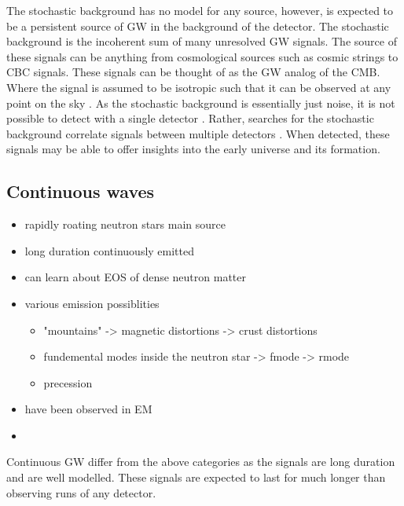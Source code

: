 The stochastic background has no model for any source, however, is expected to be a persistent source of \ac{GW} in the background of the detector. 
The stochastic background is the incoherent sum of many unresolved \ac{GW} signals.
The source of these signals can be anything from cosmological sources such as cosmic strings to \ac{CBC} signals.
These signals can be thought of as the \ac{GW} analog of the \ac{CMB}.
Where the signal is assumed to be isotropic such that it can be observed at any point on the sky \citep{Christensen2018StochasticBackgrounds}. 
As the stochastic background is essentially just noise, it is not possible to detect with a single detector \citep{Christensen2018StochasticBackgrounds}.
Rather, searches for the stochastic background correlate signals between multiple detectors \citep{Romano2019SearchesBackgrounds,Christensen2018StochasticBackgrounds}. 
When detected, these signals may be able to offer insights into the early universe and its formation.



\subsection{Continuous waves}

\begin{itemize}
    \item rapidly roating neutron stars main source
    \item long duration continuously emitted
    \item can learn about EOS of dense neutron matter
    \item various emission possiblities
    \begin{itemize}
        \item "mountains" -> magnetic distortions -> crust distortions
        \item fundemental modes inside the neutron star -> fmode -> rmode
        \item precession
    \end{itemize}
    \item have been observed in EM
    \item 
\end{itemize}

Continuous \ac{GW} differ from the above categories as the signals are long duration and are well modelled.
These signals are expected to last for much longer than observing runs of any detector. 

